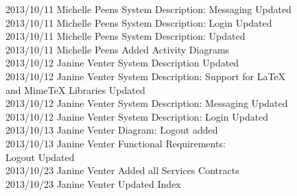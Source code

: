 \documentclass[29pt,a4paper]{moderncv}
\begin{document}
\begin{tabbing}
2013/10/11  \> Michelle Peens \> System Description: Messaging Updated\\
2013/10/11  \> Michelle Peens \> System Description: Login Updated\\
2013/10/11  \> Michelle Peens \> System Description: Updated\\
2013/10/11  \> Michelle Peens \> Added Activity Diagrams\\
2013/10/12  \> Janine Venter \> System Description Updated\\
2013/10/12  \> Janine Venter \> System Description: Support for LaTeX \\ \> \> \> and MimeTeX Libraries Updated\\
2013/10/12  \> Janine Venter \> System Description: Messaging Updated\\
2013/10/12  \> Janine Venter \> System Description: Login Updated\\
2013/10/13  \> Janine Venter \> Diagram: Logout added\\
2013/10/13  \> Janine Venter \> Functional Requirements: \\ \> \> \> Logout Updated\\
2013/10/23  \> Janine Venter \> Added all Services Contracts \\
2013/10/23  \> Janine Venter \> Updated Index \\


\end{tabbing}


\newpage
\end{document}
